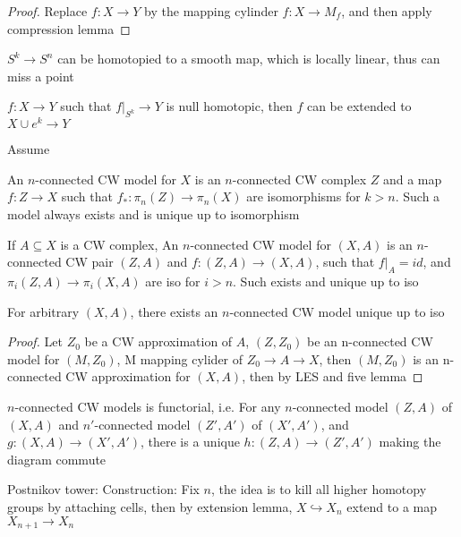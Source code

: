 \documentclass[main]{subfiles}
\begin{document}
\begin{proof}
Replace $f:X\to Y$ by the mapping cylinder $f:X\to M_f$, and then apply compression lemma
\end{proof}

$S^k\to S^n$ can be homotopied to a smooth map, which is locally linear, thus can miss a point

\begin{lemma}
$f:X\to Y$ such that $f|_{S^k}\to Y$ is null homotopic, then $f$ can be extended to $X\cup e^k\to Y$
\end{lemma}

\begin{theorem}[CW approximation]
Assume
\end{theorem}

\begin{theorem}
An $n$-connected CW model for $X$ is an $n$-connected CW complex $Z$ and a map $f:Z\to X$ such that $f_*:\pi_n(Z)\to\pi_n(X)$ are isomorphisms for $k>n$. Such a model always exists and is unique up to isomorphism
\end{theorem}

\begin{theorem}
If $A\subseteq X$ is a CW complex, An $n$-connected CW model for $(X,A)$ is an $n$-connected CW pair $(Z,A)$ and $f:(Z,A)\to(X,A)$, such that $f|_A=id$, and $\pi_i(Z,A)\to\pi_i(X,A)$ are iso for $i>n$. Such exists and unique up to iso
\end{theorem}

\begin{theorem}
For arbitrary $(X,A)$, there exists an $n$-connected CW model unique up to iso
\end{theorem}

\begin{proof}
Let $Z_0$ be a CW approximation of $A$, $(Z,Z_0)$ be an n-connected CW model for $(M,Z_0)$, M mapping cylider of $Z_0\to A\to X$, then $(M,Z_0)$ is an n-connected CW approximation for $(X,A)$, then by LES and five lemma
\end{proof}

\begin{theorem}
$n$-connected CW models is functorial, i.e. For any $n$-connected model $(Z,A)$ of $(X,A)$ and $n'$-connected model $(Z',A')$ of $(X',A')$, and $g:(X,A)\to (X',A')$, there is a unique $h:(Z,A)\to(Z',A')$ making the diagram commute
\end{theorem}

Postnikov tower: Construction: Fix $n$, the idea is to kill all higher homotopy groups by attaching cells, then by extension lemma, $X\hookrightarrow X_n$ extend to a map $X_{n+1}\to X_n$
\end{document}
